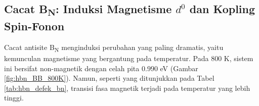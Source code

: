\subsection{Cacat B\textsubscript{N}: Induksi Magnetisme $d^0$ dan Kopling Spin-Fonon}
\label{subsec:hbn_defek_bn}
Cacat antisite B\textsubscript{N} menginduksi perubahan yang paling dramatis, yaitu kemunculan magnetisme yang bergantung pada temperatur.
Pada 800 K, sistem ini bersifat non-magnetik dengan celah pita $0.990$ eV (Gambar \ref{fig:hbn_BB_800K}).
Namun, seperti yang ditunjukkan pada Tabel \ref{tab:hbn_defek_bn}, transisi fasa magnetik terjadi pada temperatur yang lebih tinggi.
\begin{table}[htbp!] %
  \centering
  \caption{Sifat Elektronik dan Magnetik Monolayer hBN dengan Cacat Antisite B\textsubscript{N} sebagai Fungsi Temperatur.}
  \label{tab:hbn_defek_bn}
\end{table}

